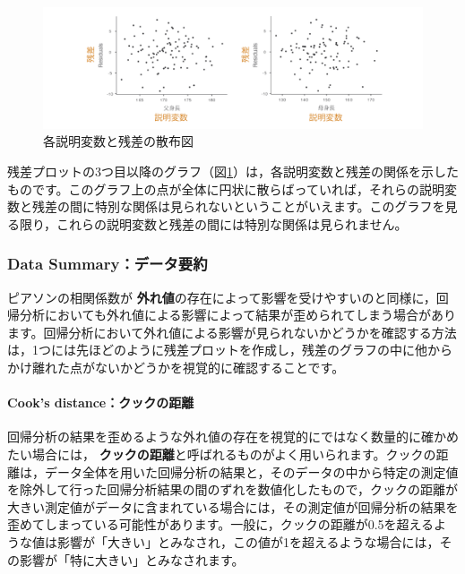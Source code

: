 \documentclass[
  12pt,
  a5jpaper,
  lualatex, ja=standard]{bxjsbook}
\renewcommand{\emph}[1]{\textbf{\color{emph} #1}}
\begin{document}
\begin{figure}[!ht]

{\centering \includegraphics[width=1\linewidth]{images/regression/lr-assumption-resplot3} 

}

\caption{各説明変数と残差の散布図}\label{fig:regression-lr-assumption-resplot3}
\end{figure}

残差プロットの3つ目以降のグラフ（図\ref{fig:regression-lr-assumption-resplot3}）は，各説明変数と残差の関係を示したものです。このグラフ上の点が全体に円状に散らばっていれば，それらの説明変数と残差の間に特別な関係は見られないということがいえます。このグラフを見る限り，これらの説明変数と残差の間には特別な関係は見られません。

\hypertarget{data-summaryux30c7ux30fcux30bfux8981ux7d04}{%
\subsubsection*{Data Summary：データ要約}\label{data-summaryux30c7ux30fcux30bfux8981ux7d04}}

ピアソンの相関係数が\emph{外れ値}の存在によって影響を受けやすいのと同様に，回帰分析においても外れ値による影響によって結果が歪められてしまう場合があります。回帰分析において外れ値による影響が見られないかどうかを確認する方法は，1つには先ほどのように残差プロットを作成し，残差のグラフの中に他からかけ離れた点がないかどうかを視覚的に確認することです。

\hypertarget{cooks-distanceux30afux30c3ux30afux306eux8dddux96e2}{%
\paragraph*{Cook's distance：クックの距離}\label{cooks-distanceux30afux30c3ux30afux306eux8dddux96e2}}

回帰分析の結果を歪めるような外れ値の存在を視覚的にではなく数量的に確かめたい場合には，\emph{クックの距離}と呼ばれるものがよく用いられます。クックの距離は，データ全体を用いた回帰分析の結果と，そのデータの中から特定の測定値を除外して行った回帰分析結果の間のずれを数値化したもので，クックの距離が大きい測定値がデータに含まれている場合には，その測定値が回帰分析の結果を歪めてしまっている可能性があります。一般に，クックの距離が0.5を超えるような値は影響が「大きい」とみなされ，この値が1を超えるような場合には，その影響が「特に大きい」とみなされます。
\end{document}
